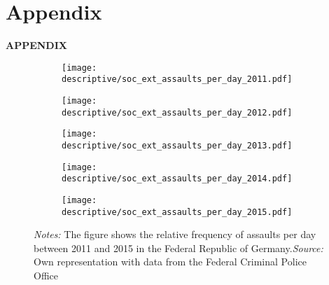 \documentclass[11pt, a4paper]{article} %
\begin{document}
\newpage
\TODO\section{Appendix}
\vspace*{\fill}
{\Huge \begin{center}\textbf{APPENDIX}\end{center}}
\vspace*{\fill}\clearpage


\renewcommand\thefigure{A\arabic{figure}}
\setcounter{figure}{0} 
\captionsetup[subfigure]{labelformat=parens}



\vspace*{\fill}
\begin{figure}[H]\centering
	\caption{Distribution of assaults across days of the year, per year}\label{fig_soc_ext:assault_year_distribution}
	\begin{subfigure}[h]{0.48\linewidth}\centering
		\texttt{[image: descriptive/soc\_ext\_assaults\_per\_day\_2011.pdf]}
	\end{subfigure}
	\begin{subfigure}[h]{0.48\linewidth}\centering
		\texttt{[image: descriptive/soc\_ext\_assaults\_per\_day\_2012.pdf]}
	\end{subfigure}\begin{subfigure}[h]{0.48\linewidth}\centering
		\texttt{[image: descriptive/soc\_ext\_assaults\_per\_day\_2013.pdf]}
	\end{subfigure}
	\begin{subfigure}[h]{0.48\linewidth}\centering
		\texttt{[image: descriptive/soc\_ext\_assaults\_per\_day\_2014.pdf]}
	\end{subfigure}
	\begin{subfigure}[h]{0.48\linewidth}\centering
		\texttt{[image: descriptive/soc\_ext\_assaults\_per\_day\_2015.pdf]}
	\end{subfigure}
	\begin{minipage}{\linewidth}
		\scriptsize{\emph{Notes:} The figure shows the relative frequency of assaults per day between 2011 and 2015 in the Federal Republic of Germany.\newline \emph{Source:} Own representation with data from the Federal Criminal Police Office}
	\end{minipage}
\end{figure}
\end{document}
